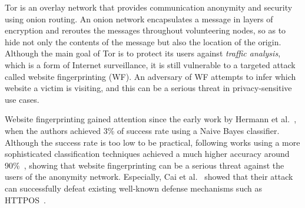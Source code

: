 
\iffalse
Anonymizing networks are privacy technologies that provide a mancinism to anonymize internet communications so as to protect users from network eavesdroppers.
Although such systems are able to hide the communication (including both routing information and content), an attacker is still able to obtain different information by analyzing the network traffic.
Network analysis can provide very rich information about message length, timing, and frequency by which an attacker can easily identify the communicating parties, and therefore bypass an anonymizing system.
This problem is known as Website Fingerprinting (WF) attack, where an adversary attempts to recognize the encrypted traffic patterns of specific web pages without using any other information \cite{juarez14, murdoch2005low}.
\fi

Tor is an overlay network that provides communication anonymity and security using onion routing.
An onion network encapsulates a message in layers of encryption and reroutes the messages throughout volunteering nodes, so as to hide not only the contents of the message but also the location of the origin.
Although the main goal of Tor is to protect its users against {\it traffic analysis}, which is a form of Internet surveillance, it is still vulnerable to a targeted attack called website fingerprinting (WF).
An adversary of WF attempts to infer which website a victim is visiting, and this can be a serious threat in privacy-sensitive use cases.

Website fingerprinting gained attention since the early work by Hermann et al.~\cite{hermann2009}, when the authors achieved 3\% of success rate using a Naive Bayes classifier.
Although the success rate is too low to be practical, following works using a more sophisticated classification techniques achieved a much higher accuracy around 90\%~\cite{panchenko11, wang2013improved, cai2012touching}, showing that website fingerprinting can be a serious threat against the users of the anonymity network.
Especially, Cai et al.~\cite{cai2012touching} showed that their attack can successfully defeat existing well-known defense mechanisms such as HTTPOS~\cite{luo2011}.

